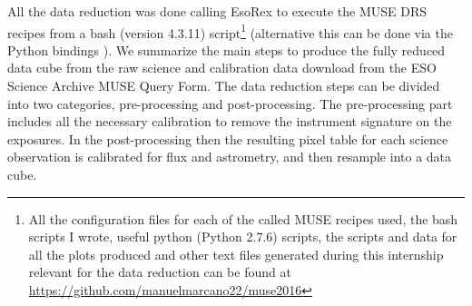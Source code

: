 All the data reduction was done calling EsoRex to execute the MUSE DRS recipes from a bash (version 4.3.11) script\footnote{All the configuration files for each of the called MUSE recipes used, the bash scripts I wrote, useful python (Python 2.7.6) scripts, the scripts and data for all the plots produced and other text files generated during this internship relevant for the data reduction can be found at \url{https://github.com/manuelmarcano22/muse2016}} (alternative this can be done via the Python bindings \citep{streicher_python_2012}). We summarize the main steps to produce the fully reduced data cube from the raw science and calibration data download from the ESO Science Archive MUSE Query Form. The data reduction steps can be divided into two categories, pre-processing and post-processing. The pre-processing part includes all the necessary calibration to remove the instrument signature on the exposures. In the post-processing then the resulting pixel table for each science observation is calibrated for flux and astrometry, and then resample into a data cube.

